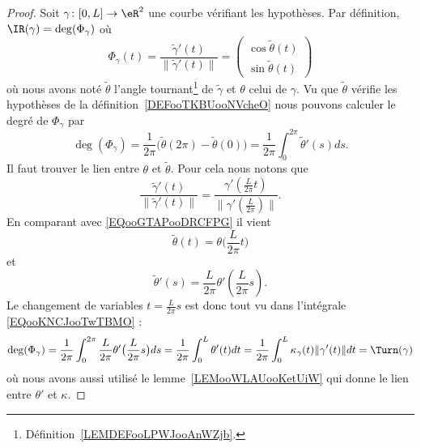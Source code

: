 \begin{proof}
	Soit \( \gamma\colon \mathopen[ 0 , L \mathclose]\to \eR^2\) une courbe vérifiant les hypothèses. Par définition, \( \IR(\gamma)=\deg(\Phi_{\gamma})\) où
	\begin{equation}        \label{EQooGTAPooDRCFPG}
		\Phi_{\gamma}(t)=\frac{ \tilde \gamma'(t) }{ \| \tilde \gamma'(t) \| }=\begin{pmatrix}
			\cos \tilde \theta(t) \\
			\sin \tilde \theta(t)
		\end{pmatrix}
	\end{equation}
	où nous avons noté \( \tilde \theta\) l'angle tournant\footnote{Définition~\ref{LEMDEFooLPWJooAnWZjb}.} de \( \tilde \gamma\) et \( \theta\) celui de \( \gamma\). Vu que \( \tilde \theta\) vérifie les hypothèses de la définition~\ref{DEFooTKBUooNVcheO} nous pouvons calculer le degré de \( \Phi_{\gamma}\) par
	\begin{equation}        \label{EQooKNCJooTwTBMO}
		\deg(\Phi_{\gamma})=\frac{1}{ 2\pi }\big( \tilde \theta(2\pi)-\tilde \theta(0) \big)=\frac{1}{ 2\pi }\int_0^{2\pi}\tilde \theta'(s)ds.
	\end{equation}
	Il faut trouver le lien entre \( \theta\) et \( \tilde \theta\). Pour cela nous notons que
	\begin{equation}
		\frac{ \tilde \gamma'(t) }{ \| \tilde \gamma'(t) \| }=\frac{ \gamma'\left( \frac{ L }{ 2\pi }t \right) }{ \| \gamma'\left( \frac{ L }{ 2\pi } \right) \| }.
	\end{equation}
	En comparant avec \eqref{EQooGTAPooDRCFPG} il vient
	\begin{equation}
		\tilde \theta(t)=\theta\big( \frac{ L }{ 2\pi }t \big)
	\end{equation}
	et
	\begin{equation}
		\tilde \theta'(s)=\frac{ L }{ 2\pi }\theta'\left( \frac{ L }{ 2\pi }s \right).
	\end{equation}
	Le changement de variables \( t=\frac{ L }{ 2\pi }s\) est donc tout vu dans l'intégrale \eqref{EQooKNCJooTwTBMO} :
	\begin{equation}
		\deg(\Phi_{\gamma})=\frac{1}{ 2\pi }\int_0^{2\pi}\frac{ L }{ 2\pi }\theta'\big( \frac{ L }{ 2\pi }s \big)ds=\frac{1}{ 2\pi }\int_0^L\theta'(t)dt=\frac{1}{ 2\pi }\int_0^L\kappa_{\gamma}(t)\| \gamma'(t) \|dt=\Turn(\gamma)
	\end{equation}
	où nous avons aussi utilisé le lemme~\ref{LEMooWLAUooKetUiW} qui donne le lien entre \( \theta'\) et \( \kappa\).
\end{proof}


